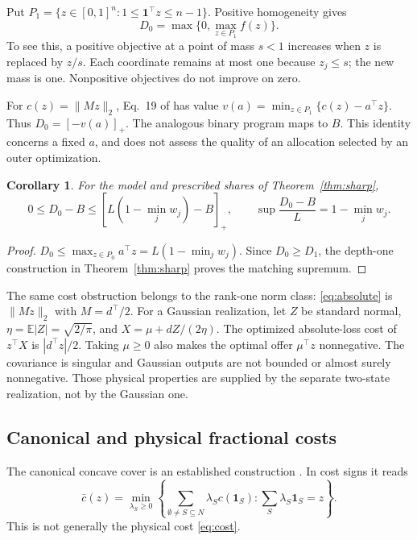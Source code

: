 \documentclass[11pt,a4paper]{article}
\newtheorem{corollary}[theorem]{Corollary}
\theoremstyle{remark}
\newcommand{\E}{\mathbb E}
\newcommand{\one}{\mathbf 1}
\newcommand{\pos}[1]{\left[#1\right]_+}
\begin{document}
Put $P_1=\{z\in[0,1]^n:1\le\one^\top z\le n-1\}$.
Positive homogeneity gives
\begin{equation}\label{eq:rootmap}
 D_0=\max\{0,\max_{z\in P_1}f(z)\}.
\end{equation}
To see this, a positive objective at a point of mass $s<1$ increases
when $z$ is replaced by $z/s$. Each coordinate remains at most one
because $z_j\le s$; the new mass is one. Nonpositive objectives do
not improve on zero.

For $c(z)=\|Mz\|_2$, Eq.~19 of \citet{burer2005centralized} has value
$v(a)=\min_{z\in P_1}\{c(z)-a^\top z\}$. Thus
$D_0=[-v(a)]_+$. The analogous binary program maps to $B$.
This identity concerns a fixed $a$, and does not assess the quality
of an allocation selected by an outer optimization.

\begin{corollary}\label{cor:root}
For the model and prescribed shares of Theorem~\ref{thm:sharp},
\[
 0\le D_0-B\le\pos{L(1-\min_jw_j)-B},\qquad
 \sup\frac{D_0-B}{L}=1-\min_jw_j.
\]
\end{corollary}
\begin{proof}
$D_0\le\max_{z\in P_0}a^\top z=L(1-\min_jw_j)$.
Since $D_0\ge D_1$, the depth-one construction in
Theorem~\ref{thm:sharp} proves the matching supremum.
\end{proof}

The same cost obstruction belongs to the rank-one norm class:
\eqref{eq:absolute} is $\|Mz\|_2$ with $M=d^\top/2$.
For a Gaussian realization, let $Z$ be standard normal,
$\eta=\E|Z|=\sqrt{2/\pi}$, and $X=\mu+dZ/(2\eta)$.
The optimized absolute-loss cost of $z^\top X$ is
$|d^\top z|/2$. Taking $\mu\ge0$ also makes the optimal offer
$\mu^\top z$ nonnegative. The covariance is singular and Gaussian
outputs are not bounded or almost surely nonnegative. Those physical
properties are supplied by the separate two-state realization, not by
the Gaussian one.

\subsection{Canonical and physical fractional costs}

The canonical concave cover is an established construction
\citep{samet1984dualcore,shellshear2009fuzzy}. In cost signs it reads
\begin{equation}\label{eq:cover}
 \bar c(z)=\min_{\lambda_S\ge0}
 \left\{\sum_{\emptyset\ne S\subseteq N}\lambda_Sc(\one_S):
       \sum_S\lambda_S\one_S=z\right\}.
\end{equation}
This is not generally the physical cost \eqref{eq:cost}.
\end{document}
